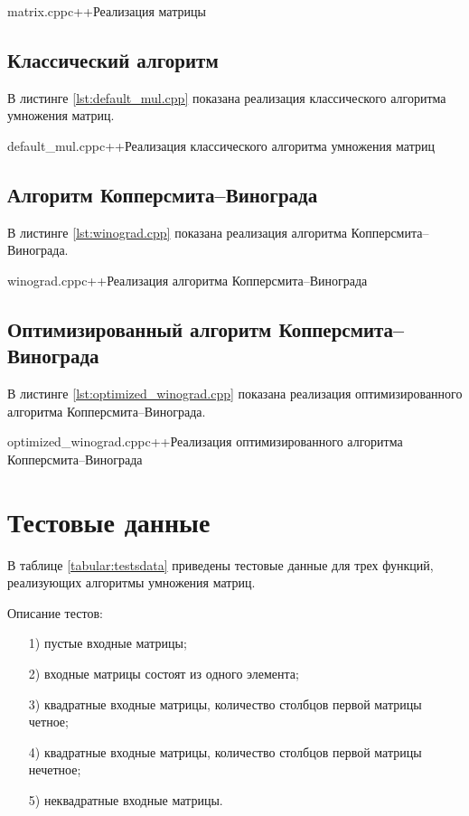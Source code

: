 {matrix.cpp}{c++}{Реализация матрицы}

\subsection{Классический алгоритм}

В листинге \ref{lst:default_mul.cpp} показана реализация классического алгоритма умножения матриц.

{default_mul.cpp}{c++}{Реализация классического алгоритма умножения матриц}

\subsection{Алгоритм Копперсмита--Винограда}

В листинге \ref{lst:winograd.cpp} показана реализация алгоритма Копперсмита--Винограда.

{winograd.cpp}{c++}{Реализация алгоритма Копперсмита--Винограда}

\subsection{Оптимизированный алгоритм Копперсмита--Винограда}

В листинге \ref{lst:optimized_winograd.cpp} показана реализация оптимизированного алгоритма Копперсмита--Винограда.

{optimized_winograd.cpp}{c++}{Реализация оптимизированного алгоритма Копперсмита--Винограда}

\section{Тестовые данные}

В таблице \ref{tabular:testsdata} приведены тестовые данные для трех функций, реализующих алгоритмы умножения матриц. 

Описание тестов:

\begin{enumerate}
\item[1)]
пустые входные матрицы;
\item[2)]
входные матрицы состоят из одного элемента;
\item[3)]
квадратные входные матрицы, количество столбцов первой матрицы четное;
\item[4)]
квадратные входные матрицы, количество столбцов первой матрицы нечетное;
\item[5)]
неквадратные входные матрицы.
\end{enumerate}

